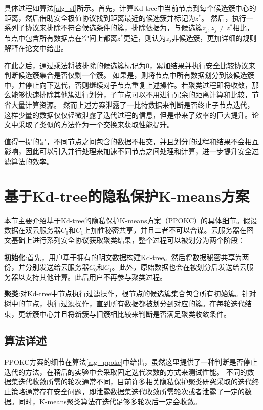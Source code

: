 具体过程如算法\ref{alg_sf}所示。首先，计算Kd-tree中当前节点到每个候选簇中心的距离，然后借助安全极值协议找到距离最近的候选簇并标记为$z^*$。
然后，执行一系列子协议来排除不符合候选条件的簇，排除依据为，与候选簇$z_j,z_j\neq z^*$相比，节点中包含所有数据点在空间上都离$z^*$更近，则认为$z_j$非候选簇，更加详细的规则解释在论文\cite{kanungo2002efficient}中给出。

在此之后，通过乘法将被排除的候选簇标记为0，累加结果并执行安全比较协议来判断候选簇集合是否仅剩一个簇。
如果是，则将节点中所有数据划分到该候选簇中，并停止向下迭代，否则继续对子节点重复上述操作。若聚类过程即将收敛，那么能够快速排除其他簇进行划分，子节点可以不用进行冗余的距离计算和比较，节省大量计算资源。
然而上述方案泄露了一比特数据来判断是否终止子节点迭代，这样少量的数据仅仅轻微泄露了迭代过程的信息，但是带来了效率的巨大提升。论文\cite{bozdemir2021privacy,boldyreva2021privacy}中采取了类似的方法作为一个交换来获取性能提升。

值得一提的是，不同节点之间包含的数据不相交，并且划分的过程和结果不会相互影响，因此可以引入并行处理来加速不同节点之间处理和计算，进一步提升安全过滤算法的效率。

\section{基于Kd-tree的隐私保护K-means方案}
\label{s3-ppokc}
本节主要介绍基于Kd-tree的隐私保护K-means方案（PPOKC）的具体细节。假设数据在双云服务器$C_0$和$C_1$上加性秘密共享，并且二者不可以合谋。云服务器在密文基础上进行系列安全协议获取聚类结果，整个过程可以被划分为两个阶段：
\begin{compactitem}
	\item \textbf{初始化}:首先，用户基于拥有的明文数据构建Kd-tree。然后将数据秘密共享为两份，并分别发送给云服务器$C_0$和$C_1$。此外，原始数据也会在被划分后发送给云服务器以支持其他计算。此后用户不再参与聚类过程。
	\item \textbf{聚类}:对Kd-tree中节点执行过滤操作，根节点的候选簇集合包含所有初始簇。针对树中的节点，执行过滤操作，直到所有数据都被划分到对应的簇。在每轮迭代结束，更新簇中心并且将新簇与旧簇相比较来判断是否满足聚类收敛条件。
\end{compactitem}

\subsection{算法详述}
PPOKC方案的细节在算法\ref{alg_ppokc}中给出，虽然这里提供了一种判断是否停止迭代的方法，在稍后的实验中会采取固定迭代次数的方式来测试性能。
不同的数据集迭代收敛所需的轮次通常不同，目前许多相关隐私保护聚类研究采取的迭代终止策略通常存在安全问题，即泄露数据集迭代收敛所需轮次或者泄露了一定的数据。同时，K-means聚类算法在迭代足够多轮次后一定会收敛\cite{mohassel2019practical}。


